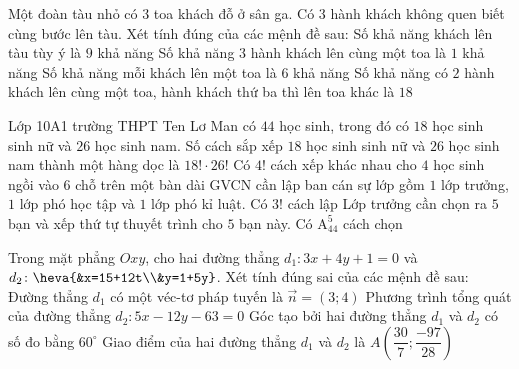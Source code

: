 \begin{ex}%
	Một đoàn tàu nhỏ có $3$ toa khách đỗ ở sân ga. Có $3$ hành khách không quen biết cùng bước lên tàu. Xét tính đúng của các mệnh đề sau:
	\choiceTF
	{Số khả năng khách lên tàu tùy ý là $9$ khả năng}
	{Số khả năng $3$ hành khách lên cùng một toa là $1$ khả năng}
	{\True Số khả năng mỗi khách lên một toa là $6$ khả năng}
	{\True Số khả năng có $2$ hành khách lên cùng một toa, hành khách thứ ba thì lên toa khác là $18$}
\end{ex}

\begin{ex} %
	Lớp 10A1 trường THPT Ten Lơ Man có $44$ học sinh, trong đó có $18$ học sinh sinh nữ và $26$ học sinh nam.
	\choiceTF 
	{Số cách sắp xếp $18$ học sinh sinh nữ và $26$ học sinh nam thành một hàng dọc là $18!\cdot 26!$}
	{Có $4!$ cách xếp khác nhau cho $4$ học sinh ngồi vào $6$ chỗ trên một bàn dài}
	{GVCN cần lập ban cán sự lớp gồm $1$ lớp trưởng, $1$ lớp phó học tập và $1$ lớp phó kỉ luật. Có $3!$ cách lập}
	{\True Lớp trưởng cần chọn ra $5$ bạn và xếp thứ tự thuyết trình cho $5$ bạn này. Có $\mathrm{A}_{44}^5$ cách chọn}
	\loigiai 
	{
	
	}
\end{ex}

\begin{ex}%
	Trong mặt phẳng $Oxy$, cho hai đường thẳng $d_1\colon 3x+4y+1=0$ và $d_2\colon\heva{&x=15+12t\\&y=1+5y}$. Xét tính đúng sai của các mệnh đề sau:
	\choiceTF
	{\True Đường thẳng $d_1$ có một véc-tơ pháp tuyến là $\overrightarrow{n}=(3;4)$}
	{\True Phương trình tổng quát của đường thẳng $d_2\colon 5x-12y-63=0$}
	{Góc tạo bởi hai đường thẳng $d_1$ và $d_2$ có số đo bằng $60^\circ$}
	{\True Giao điểm của hai đường thẳng $d_1$ và $d_2$ là $A\left(\dfrac{30}{7};\dfrac{-97}{28}\right)$}
	\loigiai{
		
	}
\end{ex}

